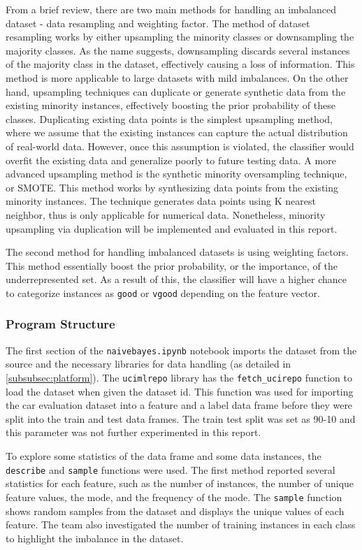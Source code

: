 \documentclass[a4paper]{article}
\begin{document}
From a brief review, there are two main methods for handling an imbalanced dataset - data resampling and weighting factor.
The method of dataset resampling works by either upsampling the minority classes or downsampling the majority classes. As the name suggests, downsampling discards several instances of the majority class in the dataset, effectively causing a loss of information. This method is more applicable to large datasets with mild imbalances. On the other hand, upsampling techniques can duplicate or generate synthetic data from the existing minority instances, effectively boosting the prior probability of these classes. Duplicating existing data points is the simplest upsampling method, where we assume that the existing instances can capture the actual distribution of real-world data. However, once this assumption is violated, the classifier would overfit the existing data and generalize poorly to future testing data. A more advanced upsampling method is the synthetic minority oversampling technique, or SMOTE. This method works by synthesizing data points from the existing minority instances. The technique generates data points using K nearest neighbor, thus is only applicable for numerical data. Nonetheless, minority upsampling via duplication will be implemented and evaluated in this report.

The second method for handling imbalanced datasets is using weighting factors. This method essentially boost the prior probability, or the importance, of the underrepresented set. As a result of this, the classifier will have a higher chance to categorize instances as \lstinline{good} or \lstinline{vgood} depending on the feature vector.

\subsubsection{Program Structure}
The first section of the \lstinline{naivebayes.ipynb} notebook imports the dataset from the source and the necessary libraries for data handling (as detailed in \ref{subsubsec:platform}). The \lstinline{ucimlrepo} library has the \lstinline{fetch_ucirepo} function to load the dataset when given the dataset id. This function was used for importing the car evaluation dataset into a feature and a label data frame before they were split into the train and test data frames. The train test split was set as 90-10 and this parameter was not further experimented in this report.

To explore some statistics of the data frame and some data instances, the \lstinline{describe} and \lstinline{sample} functions were used. The first method reported several statistics for each feature, such as the number of instances, the number of unique feature values, the mode, and the frequency of the mode. The \lstinline{sample} function shows random samples from the dataset and displays the unique values of each feature. The team also investigated the number of training instances in each class to highlight the imbalance in the dataset.
\end{document}
